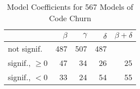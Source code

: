 
\begin{table}[t] \centering
\small
  \caption{Model Coefficients for 567 Models of Code Churn}
  \label{Table:rddmodels}
\begin{tabular}{ l  r r r r }        
\hline 

 & $\beta$ & $\gamma$ & $\delta$ & $\beta + \delta$ \\ 
 \hline 
 \hline
not signif. & 487 & 507 & 487 & \\
\hline
signif., $\ge 0$ & 47 & 34 & 26 & 25 \\
\hline
signif., $<0$ & 33 & 24 & 54 & 55 \\
\hline
\end{tabular}
\end{table}